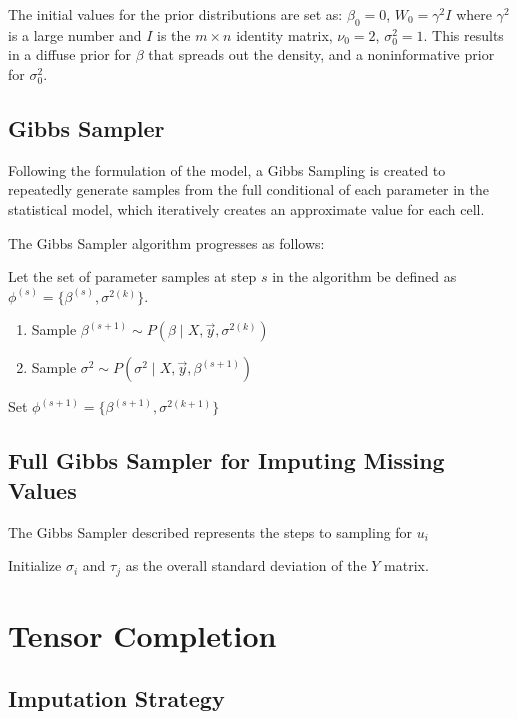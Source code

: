 \documentclass[12pt,twoside]{dukestatscithesis}
\theoremstyle{definition}
\theoremstyle{definition}
\theoremstyle{definition}
\theoremstyle{remark}
\begin{document}
The initial values for the prior distributions are set as:
\(\beta_0 = 0\), \(W_0 = \gamma^2I\) where \(\gamma^2\) is a large
number and \(I\) is the \(m \times n\) identity matrix, \(\nu_0 = 2\),
\(\sigma_0^2 = 1\). This results in a diffuse prior for \(\beta\) that
spreads out the density, and a noninformative prior for \(\sigma^2_0\).

\section{Gibbs Sampler}\label{gibbs-sampler}

Following the formulation of the model, a Gibbs Sampling is created to
repeatedly generate samples from the full conditional of each parameter
in the statistical model, which iteratively creates an approximate value
for each cell.

The Gibbs Sampler algorithm progresses as follows:

Let the set of parameter samples at step \(s\) in the algorithm be
defined as \(\phi^{(s)} = \{\beta^{(s)}, \sigma^{2(k)}\}\).
\begin{enumerate}
\def\labelenumi{\arabic{enumi}.}
\item
  Sample \(\beta^{(s+1)} \sim P(\beta \mid X, \vec{y}, \sigma^{2(k)})\)
\item
  Sample \(\sigma^2 \sim P(\sigma^2 \mid X, \vec{y}, \beta^{(s+1)})\)
\end{enumerate}
Set \(\phi^{(s+1)} = \{\beta^{(s+1)}, \sigma^{2(k+1)}\}\)

\section{Full Gibbs Sampler for Imputing Missing
Values}\label{full-gibbs-sampler-for-imputing-missing-values}

The Gibbs Sampler described represents the steps to sampling for \(u_i\)

Initialize \(\sigma_i\) and \(\tau_j\) as the overall standard deviation
of the \(Y\) matrix.

\chapter{Tensor Completion}\label{tensor-completion}

\section{Imputation Strategy}\label{imputation-strategy}
\end{document}
